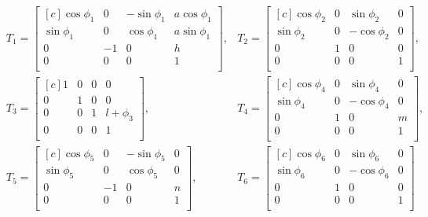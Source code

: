 \documentclass[onecolumn,10pt]{jhwhw}
\begin{document}
\begin{align*}
& T_1=
\begin{bmatrix*}[c]
\cos \phi_1 &  0 & -\sin \phi_1 & a \cos \phi_1 \\
\sin \phi_1 &  0 &  \cos \phi_1 & a \sin \phi_1 \\
          0 & -1 &          0 &           h \\
          0 &  0 &          0 &           1 \\
\end{bmatrix*},
& T_2=
\begin{bmatrix*}[c]
\cos \phi_2 & 0 &  \sin \phi_2 & 0 \\
\sin \phi_2 & 0 & -\cos \phi_2 & 0 \\
        0 & 1 &          0 & 0 \\
        0 & 0 &          0 & 1 \\
\end{bmatrix*}, \\
& T_3=
\begin{bmatrix*}[c]
1 & 0 & 0 &         0 \\
0 & 1 & 0 &         0 \\
0 & 0 & 1 & l + \phi_3\\
0 & 0 & 0 &         1 \\
\end{bmatrix*},
& T_4=
\begin{bmatrix*}[c]
\cos \phi_4 & 0 &  \sin \phi_4 & 0 \\
\sin \phi_4 & 0 & -\cos \phi_4 & 0 \\
        0 & 1 &          0 & m \\
        0 & 0 &          0 & 1 \\
\end{bmatrix*}, \\
& T_5=
\begin{bmatrix*}[c]
\cos \phi_5 &  0 & -\sin \phi_5 & 0 \\
\sin \phi_5 &  0 &  \cos \phi_5 & 0 \\
        0 & -1 &          0 & n \\
        0 &  0 &          0 & 1 \\
\end{bmatrix*},
& T_6=
\begin{bmatrix*}[c]
\cos \phi_6 & 0 &  \sin \phi_6 & 0 \\
\sin \phi_6 & 0 & -\cos \phi_6 & 0 \\
        0 & 1 &          0 & 0 \\
        0 & 0 &          0 & 1 \\
\end{bmatrix*}
\end{align*}
\end{document}
